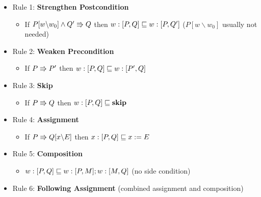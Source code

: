 \begin{itemize}
	
	\item Rule 1: \textbf{Strengthen Postcondition}
	
	\begin{itemize}
		
		\item If $ P[w \backslash w_0] \land Q' \Rrightarrow Q $ then $ w : [P, Q] \mathrel{\sqsubseteq} w : [P, Q'] $ ($ P[w \backslash w_0] $ usually not needed)
		
	\end{itemize}
	
	\item Rule 2: \textbf{Weaken Precondition}
	
	\begin{itemize}
		
		\item If $ P \Rrightarrow P' $ then $ w : [P, Q] \mathrel{\sqsubseteq} w : [P', Q] $
		
	\end{itemize}

	\item Rule 3: \textbf{Skip}
	
	\begin{itemize}
		
		\item If $ P \Rrightarrow Q $ then $ w : [P, Q] \mathrel{\sqsubseteq} {\bf skip} $
		
	\end{itemize}

	\item Rule 4: \textbf{Assignment}
	
	\begin{itemize}
		
		\item If $ P \Rrightarrow Q[x \backslash E] $ then $ x : [P, Q] \mathrel{\sqsubseteq} x := E $
		
	\end{itemize}
	
	\item Rule 5: \textbf{Composition}
	
	\begin{itemize}
		
		\item $ w : [P, Q] \mathrel{\sqsubseteq} w : [P, M]; w : [M, Q] $ (no side condition)
		
	\end{itemize}

	\item Rule 6: \textbf{Following Assignment} (combined assignment and composition)
	

\end{itemize}
